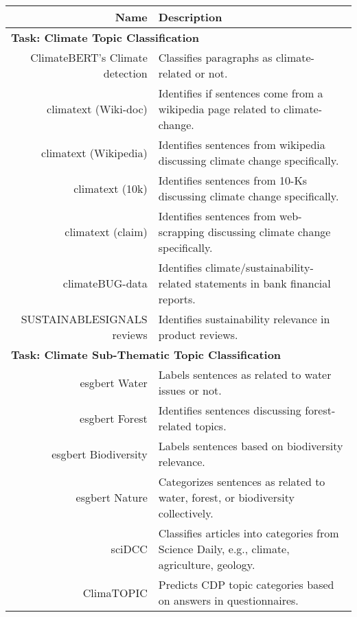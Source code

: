 \begin{table}[htbp]
\centering
\small
\begin{tabular}{rp{10cm}}
\hline
\hline
\textbf{Name} & \textbf{Description} \\
\hline
\multicolumn{2}{l}{\textbf{Task: Climate Topic Classification}} \\
\hline
ClimateBERT's Climate detection \cite{bingler2023cheaptalkspecificitysentiment} &  Classifies paragraphs as climate-related or not. \\
\hline
climatext (Wiki-doc) \cite{varini_climatext_2020} &  Identifies if sentences come from a wikipedia page related to climate-change. \\
\hline
climatext (Wikipedia) \cite{varini_climatext_2020} &  Identifies sentences from wikipedia discussing climate change specifically. \\
\hline
climatext (10k) \cite{varini_climatext_2020} &  Identifies sentences from 10-Ks discussing climate change specifically. \\
\hline
climatext (claim) \cite{varini_climatext_2020} &  Identifies sentences from web-scrapping discussing climate change specifically. \\
\hline
climateBUG-data \cite{yu_climatebug_2024} &  Identifies climate/sustainability-related statements in bank financial reports. \\
\hline
SUSTAINABLESIGNALS reviews \cite{linSUSTAINABLESIGNALSijcai2023} &  Identifies sustainability relevance in product reviews. \\
\hline
\multicolumn{2}{l}{\textbf{Task: Climate Sub-Thematic Topic Classification}} \\
\hline
esgbert Water \cite{Schimanski2024nature} &  Labels sentences as related to water issues or not. \\
\hline
esgbert Forest \cite{Schimanski2024nature} &  Identifies sentences discussing forest-related topics. \\
\hline
esgbert Biodiversity \cite{Schimanski2024nature} &  Labels sentences based on biodiversity relevance. \\
\hline
esgbert Nature \cite{Schimanski2024nature} &  Categorizes sentences as related to water, forest, or biodiversity collectively. \\
\hline
sciDCC \cite{mishra2021neuralnere} &  Classifies articles into categories from Science Daily, e.g., climate, agriculture, geology. \\
\hline
ClimaTOPIC \cite{spokoyny2023answering} &  Predicts CDP topic categories based on answers in questionnaires. \\

\end{tabular}
\end{table}
